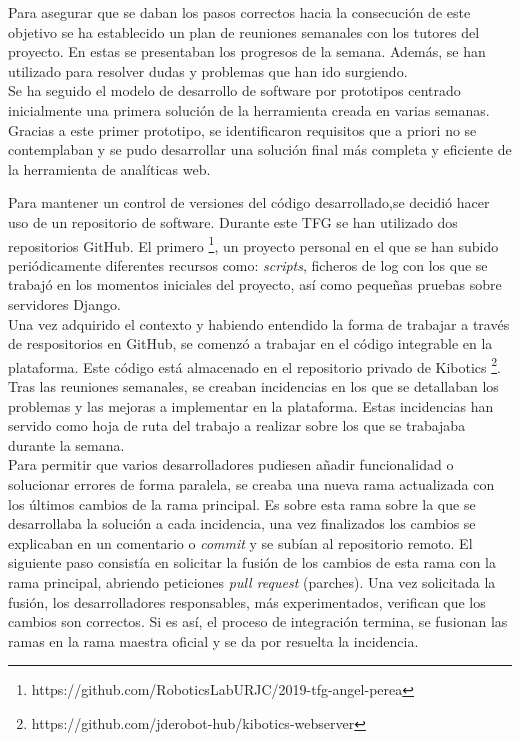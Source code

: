 \documentclass[a4paper, 12pt]{book}
\begin{document}
		Para asegurar que se daban los pasos correctos hacia la consecución de este objetivo se ha establecido un plan de reuniones semanales con los tutores del proyecto. En estas se presentaban los progresos de la semana. Además, se han utilizado para resolver dudas y problemas que han ido surgiendo.\\
		
		Se ha seguido el modelo de desarrollo de software por prototipos centrado inicialmente una primera solución de la herramienta creada en varias semanas. Gracias a este primer prototipo, se identificaron requisitos que a priori no se contemplaban y se pudo desarrollar una solución final más completa y eficiente de la herramienta de analíticas web.
		
		Para mantener un control de versiones del código desarrollado,se decidió hacer uso de un repositorio de software. Durante este TFG se han utilizado dos repositorios GitHub. El primero \footnote{https://github.com/RoboticsLabURJC/2019-tfg-angel-perea}, un proyecto personal en el que se han subido periódicamente diferentes recursos como: \textit{scripts}, ficheros de log con los que se trabajó en los momentos iniciales del proyecto, así como pequeñas pruebas sobre servidores Django. \\
		
		Una vez adquirido el contexto y habiendo entendido la forma de trabajar a través de respositorios en GitHub, se comenzó a trabajar en el código integrable en la plataforma. Este código está almacenado en el repositorio privado de Kibotics \footnote{https://github.com/jderobot-hub/kibotics-webserver}. Tras las reuniones semanales, se creaban incidencias en los que se detallaban los problemas y las mejoras a implementar en la plataforma. Estas incidencias han servido como hoja de ruta del trabajo a realizar sobre los que se trabajaba durante la semana. \\
		
		Para permitir que varios desarrolladores pudiesen añadir funcionalidad o solucionar errores de forma paralela, se creaba una nueva rama actualizada con los últimos cambios de la rama principal. Es sobre esta rama sobre la que se desarrollaba la solución a cada incidencia, una vez finalizados los cambios se explicaban en un comentario o \textit{commit} y se subían al repositorio remoto. El siguiente paso consistía en solicitar la fusión de los cambios de esta rama con la rama principal, abriendo peticiones \textit{pull request} (parches). Una vez solicitada la fusión, los desarrolladores responsables, más experimentados, verifican que los cambios son correctos. Si es así, el proceso de integración termina, se fusionan las ramas en la rama maestra oficial y se da por resuelta la incidencia. \\
		
\end{document}
